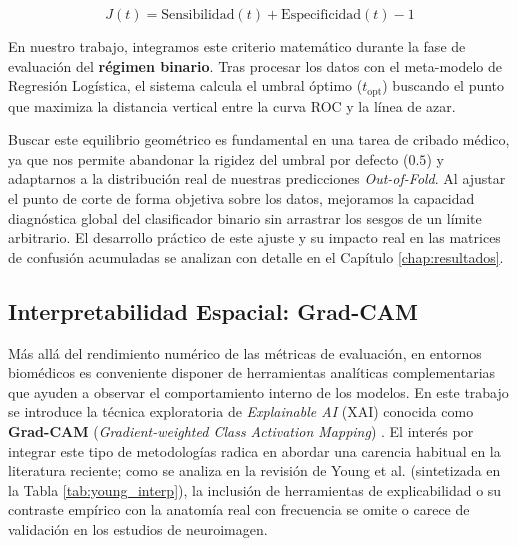 \documentclass[12pt, oneside, english, spanish]{book}
\begin{document}
\begin{equation}
	J(t) = \text{Sensibilidad}(t) + \text{Especificidad}(t) - 1
\end{equation}

En nuestro trabajo, integramos este criterio matemático durante la fase de evaluación del \textbf{régimen binario}. Tras procesar los datos con el meta-modelo de Regresión Logística, el sistema calcula el umbral óptimo ($t_{\text{opt}}$) buscando el punto que maximiza la distancia vertical entre la curva ROC y la línea de azar. 

Buscar este equilibrio geométrico es fundamental en una tarea de cribado médico, ya que nos permite abandonar la rigidez del umbral por defecto ($0.5$) y adaptarnos a la distribución real de nuestras predicciones \textit{Out-of-Fold}. Al ajustar el punto de corte de forma objetiva sobre los datos, mejoramos la capacidad diagnóstica global del clasificador binario sin arrastrar los sesgos de un límite arbitrario. El desarrollo práctico de este ajuste y su impacto real en las matrices de confusión acumuladas se analizan con detalle en el Capítulo \ref{chap:resultados}.

\subsection{Interpretabilidad Espacial: Grad-CAM} \label{subsec:gradcam_teoria}

Más allá del rendimiento numérico de las métricas de evaluación, en entornos biomédicos es conveniente disponer de herramientas analíticas complementarias que ayuden a observar el comportamiento interno de los modelos. En este trabajo se introduce la técnica exploratoria de \textit{Explainable AI} (XAI) conocida como \textbf{Grad-CAM} (\textit{Gradient-weighted Class Activation Mapping}) \cite{selvaraju2017grad}. El interés por integrar este tipo de metodologías radica en abordar una carencia habitual en la literatura reciente; como se analiza en la revisión de Young et al. \cite{young2025} (sintetizada en la Tabla \ref{tab:young_interp}), la inclusión de herramientas de explicabilidad o su contraste empírico con la anatomía real con frecuencia se omite o carece de validación en los estudios de neuroimagen.
\end{document}
